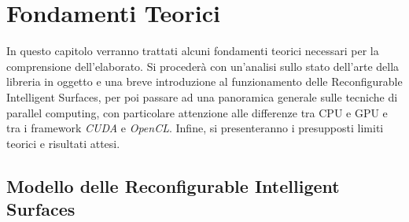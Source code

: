 \chapter{Fondamenti Teorici}
\label{ch:fondamenti}

In questo capitolo verranno trattati alcuni fondamenti teorici necessari per la
comprensione dell'elaborato. Si procederà con un'analisi sullo stato dell'arte della
libreria in oggetto e una breve introduzione al funzionamento delle Reconfigurable
Intelligent Surfaces, per poi passare ad una panoramica generale sulle tecniche
di parallel computing, con particolare attenzione alle differenze tra CPU e GPU e
tra i framework \textit{CUDA} e \textit{OpenCL}. Infine, si presenteranno i presupposti
limiti teorici e risultati attesi.

\section[Modello delle Reconfigurable Intelligent Surfaces]{Modello delle
Reconfigurable Intelligent Surfaces\cite{cooperis}}
\label{sec:statodellarte}


